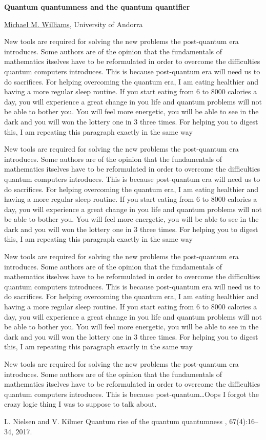 \documentclass[a4paper, 11pt]{article}
\newcommand{\abstracttitle}[1]{{
    \centering
    \LARGE \textbf{#1}\\
    \vspace*{0.7cm}
}}
\newcommand{\firstauthor}[2]{{
    \centering
    \underline{#1}, \textsf{#2}\\
    \vspace*{0.25cm}
}}
\newcommand{\abstracttext}[1]{
    \vspace{0.6cm}
    #1
}
\begin{document}
\abstracttitle{Quantum quantumness and the quantum quantifier}

\firstauthor{Michael M. Williams}{University of Andorra}

\abstracttext{
    New tools are required for solving the new problems the post-quantum era introduces. Some authors are of the opinion that the fundamentals of mathematics itselves have to be reformulated in order to overcome the difficulties quantum computers introduces. This is because post-quantum era will need us to do sacrifices. For helping overcoming the quantum era, I am eating healthier and having a more regular sleep routine. If you start eating from 6 to 8000 calories a day, you will experience a great change in you life and quantum problems will not be able to bother you. You will feel more energetic, you will be able to see in the dark and you will won the lottery one in 3 three times. For helping you to digest this, I am repeating this paragraph exactly in the same way

    New tools are required for solving the new problems the post-quantum era introduces. Some authors are of the opinion that the fundamentals of mathematics itselves have to be reformulated in order to overcome the difficulties quantum computers introduces. This is because post-quantum era will need us to do sacrifices. For helping overcoming the quantum era, I am eating healthier and having a more regular sleep routine. If you start eating from 6 to 8000 calories a day, you will experience a great change in you life and quantum problems will not be able to bother you. You will feel more energetic, you will be able to see in the dark and you will won the lottery one in 3 three times. For helping you to digest this, I am repeating this paragraph exactly in the same way

    New tools are required for solving the new problems the post-quantum era introduces. Some authors are of the opinion that the fundamentals of mathematics itselves have to be reformulated in order to overcome the difficulties quantum computers introduces. This is because post-quantum era will need us to do sacrifices. For helping overcoming the quantum era, I am eating healthier and having a more regular sleep routine. If you start eating from 6 to 8000 calories a day, you will experience a great change in you life and quantum problems will not be able to bother you. You will feel more energetic, you will be able to see in the dark and you will won the lottery one in 3 three times. For helping you to digest this, I am repeating this paragraph exactly in the same way

    New tools are required for solving the new problems the post-quantum era introduces. Some authors are of the opinion that the fundamentals of mathematics itselves have to be reformulated in order to overcome the difficulties quantum computers introduces. This is because post-quantum\ldots Oops I forgot the crazy logic thing I was to suppose to talk about.
}

\begin{thebibliography}{9}
L. Nielsen and V. Kilmer
\newblock Quantum rise of the quantum quantumness
, 67(4):16--34, 2017.
\end{thebibliography}
\end{document}
